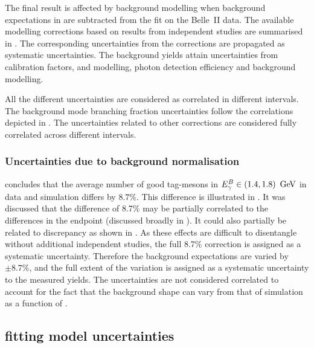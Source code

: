 The final result is affected by background modelling when background expectations in \MC are subtracted from the \Mbc fit on the Belle~II data.
The available modelling corrections based on results from independent studies are summarised in .
The corresponding uncertainties from the corrections are propagated as systematic uncertainties.
The background yields attain uncertainties from \FEI calibration factors, \piVeto and \etaVeto modelling, photon detection efficiency and background modelling. 

All the different uncertainties are considered as correlated in different \EB intervals.
The background mode branching fraction uncertainties follow the correlations depicted in .
The uncertainties related to other corrections are considered fully correlated across different \EB intervals.

\subsubsection{Uncertainties due to background normalisation}\label{sec:background_normalisation_systematic}

 concludes that the average number of 
good tag-\B mesons in ${E^B_{\gamma}}\in(1.4,1.8)~\mathrm{\,Ge\kern -0.1em V}$ in data and simulation differs by $8.7\%$.
This difference is illustrated in .
It was discussed that the difference of 8.7\% may be partially correlated to the differences in the \Mbc endpoint (discussed broadly in ).
It could also partially be related to \ZMVA discrepancy as shown in .
As these effects are difficult to disentangle without additional independent studies, the full 8.7\% correction is assigned as a systematic uncertainty.
Therefore the background expectations are varied by $\pm 8.7\%$, and the full extent of the variation is assigned as a systematic uncertainty to the measured \BtoXsgamma yields.
The uncertainties are not considered correlated to account for the fact that the background shape can vary from that of simulation as a function of \EB.



\subsection{\texorpdfstring{\Mbc}{Mbc} fitting model uncertainties}\label{sec:fit_uncertainties}

